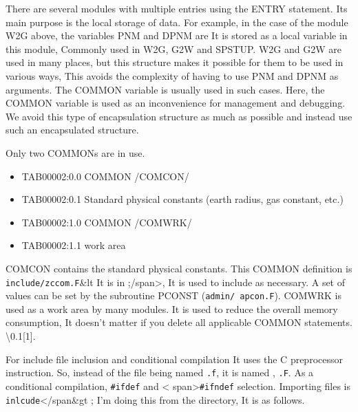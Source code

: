 There are several modules with multiple entries using the ENTRY
statement. Its main purpose is the local storage of data. For example,
in the case of the module W2G above, the variables PNM and DPNM are It
is stored as a local variable in this module, Commonly used in W2G, G2W
and SPSTUP. W2G and G2W are used in many places, but this structure
makes it possible for them to be used in various ways, This avoids the
complexity of having to use PNM and DPNM as arguments. The COMMON
variable is usually used in such cases. Here, the COMMON variable is
used as an inconvenience for management and debugging. We avoid this
type of encapsulation structure as much as possible and instead use such
an encapsulated structure.

Only two COMMONs are in use.

\begin{itemize}
\item
  TAB00002:0.0 COMMON /COMCON/
\item
  TAB00002:0.1 Standard physical constants (earth radius, gas constant,
  etc.)
\item
  TAB00002:1.0 COMMON /COMWRK/
\item
  TAB00002:1.1 work area
\end{itemize}

COMCON contains the standard physical constants. This COMMON definition
is \texttt{include/zccom.F}\&lt It is in ;/span\textgreater, It is used
to include as necessary. A set of values can be set by the subroutine
PCONST ({\texttt{admin/\ apcon.F}}). COMWRK is used as a work area by
many modules. It is used to reduce the overall memory consumption, It
doesn't matter if you delete all applicable COMMON statements.
\textbackslash0.1{[}1{]}.

For include file inclusion and conditional compilation It uses the C
preprocessor instruction. So, instead of the file being named
{\texttt{.f}}, it is named , {\texttt{.F}}. As a conditional
compilation, {\texttt{\#ifdef}} and \textless{}
span\textgreater{}\texttt{\#ifndef} selection. Importing files is
\texttt{inlcude}\textless/span\&gt ; I'm doing this from the directory,
It is as follows.

